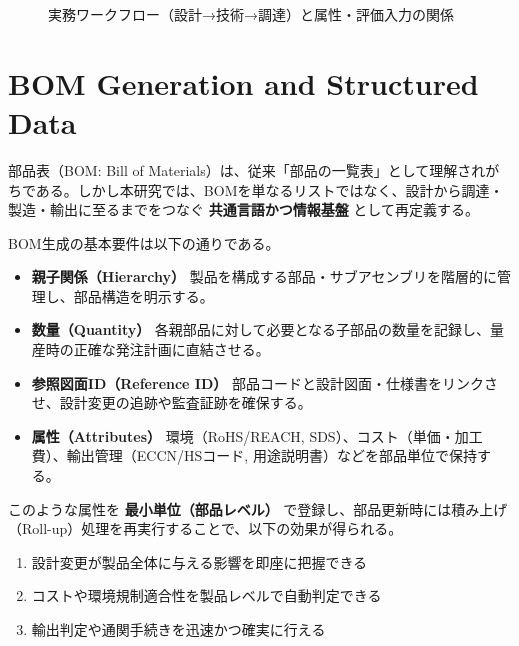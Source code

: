 \documentclass[10pt,conference]{IEEEtran}
\begin{document}
\begin{figure*}[t]
{%
}
\caption{実務ワークフロー（設計→技術→調達）と属性・評価入力の関係}
\label{fig:workflow_tikz}
\end{figure*}

\section{BOM Generation and Structured Data}
部品表（BOM: Bill of Materials）は、従来「部品の一覧表」として理解されがちである。しかし本研究では、BOMを単なるリストではなく、設計から調達・製造・輸出に至るまでをつなぐ \textbf{共通言語かつ情報基盤} として再定義する。

BOM生成の基本要件は以下の通りである。
\begin{itemize}
  \item \textbf{親子関係（Hierarchy）}  
  製品を構成する部品・サブアセンブリを階層的に管理し、部品構造を明示する。
  \item \textbf{数量（Quantity）}  
  各親部品に対して必要となる子部品の数量を記録し、量産時の正確な発注計画に直結させる。
  \item \textbf{参照図面ID（Reference ID）}  
  部品コードと設計図面・仕様書をリンクさせ、設計変更の追跡や監査証跡を確保する。
  \item \textbf{属性（Attributes）}  
  環境（RoHS/REACH, SDS）、コスト（単価・加工費）、輸出管理（ECCN/HSコード, 用途説明書）などを部品単位で保持する。
\end{itemize}

このような属性を \textbf{最小単位（部品レベル）} で登録し、部品更新時には積み上げ（Roll-up）処理を再実行することで、以下の効果が得られる。
\begin{enumerate}
  \item 設計変更が製品全体に与える影響を即座に把握できる  
  \item コストや環境規制適合性を製品レベルで自動判定できる  
  \item 輸出判定や通関手続きを迅速かつ確実に行える  
\end{enumerate}
\end{document}
